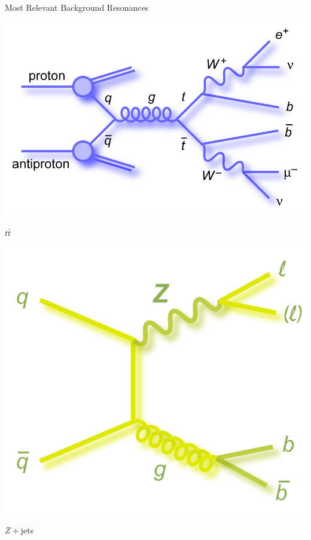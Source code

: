 \documentclass[10pt]{beamer} %
\begin{document}
\begin{frame}{Most Relevant Background Resonances}
    
    \begin{minipage}[b]{0.49\linewidth}
        \centering
        \includegraphics[width=1.0\textwidth]{Figs/feynman_ttbar_emu.png}
        \caption{$t\bar{t}$}
    \end{minipage}
        \hfill
    \begin{minipage}[b]{0.49\linewidth}
        \centering
        \includegraphics[width=1.0\textwidth]{Figs/feynman_Z_llbb.png}
        \caption{$Z+$jets}
    \end{minipage}

\end{frame}
\end{document}
